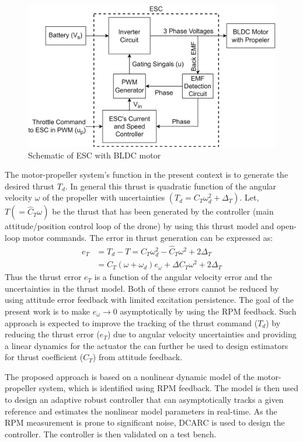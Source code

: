 \begin{figure}[h]
    \centering
    \includegraphics[width = \figsize]{./figs/figs_acc/schematic/esc_schematic.png}
    \caption{Schematic of ESC with BLDC motor}
    \label{fig::bldc_diag}
\end{figure}

The motor-propeller system's function in the present context is to generate the
desired thrust $T_d$. In general this thrust is quadratic function of the
angular velocity $\omega$ of the propeller with uncertainties $(T_d = C_T
\omega_d^2 + \Delta_T)$. Let, $T (=\hat C_T \omega)$ be the thrust that has
been generated by the controller (main attitude/position control loop of the
drone) by using this thrust model and open-loop motor commands. The error in
thrust generation can be expressed as:
\begin{align*}
    e_T &= T_d - T = C_T \omega_d^2 - \hat C_T \omega^2 + 2 \Delta_T\\
        &= C_T (\omega + \omega_d) e_{\omega} + \Delta C_T \omega^2 + 2 \Delta_T
\end{align*}
Thus the thrust error $e_T$ is a function of the angular velocity error and the
uncertainties in the thrust model. Both of these errors cannot be reduced by
using attitude error feedback with limited excitation persistence. The goal of the present work is to make $e_\omega \rightarrow 0$ asymptotically
by using the RPM feedback. Such approach is expected to improve the tracking of
the thrust command ($T_d$) by reducing the thrust error ($e_T$) due to angular
velocity uncertainties and providing a linear dynamics for the actuator the can
further be used to design estimators for thrust coefficient ($C_T$)
from attitude feedback.

The proposed approach is based on a nonlinear dynamic model of the
motor-propeller system, which is identified using RPM feedback. The model is
then used to design an adaptive robust controller that can asymptotically tracks
a given reference and estimates the nonlinear model parameters in real-time. As
the RPM measurement is prone to significant noise, DCARC is used to design the
controller. The controller is then validated on a test bench.

